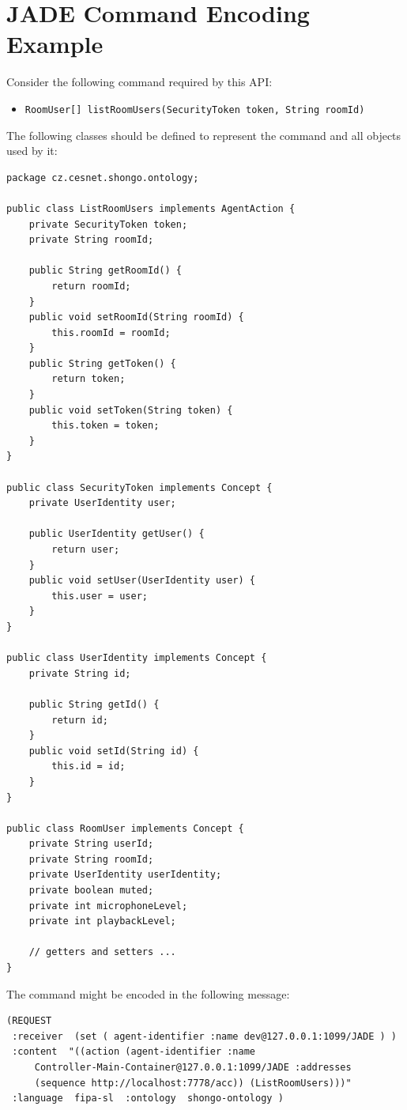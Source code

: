 \documentclass[a4paper]{report}
\newenvironment{Api}{\begin{itemize}}{\end{itemize}}
\newcommand{\ApiCode}[1]{\lstinline[style=styleApi]|#1|}
\newcommand{\ApiItem}[1]{\item #1 %

}
\newcommand{\ApiCmd}[1]{\ApiItem{\ApiCode{#1}}}
\begin{document}
\chapter{JADE Command Encoding Example} \label{appendix:jade-command-encoding}

Consider the following command required by this API:
\begin{Api}
\ApiCmd{RoomUser[] listRoomUsers(SecurityToken token, String roomId)}
\end{Api}

The following classes should be defined to represent the command and all objects used by it:
\begin{verbatim}
package cz.cesnet.shongo.ontology;

public class ListRoomUsers implements AgentAction {
    private SecurityToken token;
    private String roomId;

    public String getRoomId() {
        return roomId;
    }
    public void setRoomId(String roomId) {
        this.roomId = roomId;
    }
    public String getToken() {
        return token;
    }
    public void setToken(String token) {
        this.token = token;
    }
}

public class SecurityToken implements Concept {
    private UserIdentity user;

    public UserIdentity getUser() {
        return user;
    }
    public void setUser(UserIdentity user) {
        this.user = user;
    }
}

public class UserIdentity implements Concept {
    private String id;

    public String getId() {
        return id;
    }
    public void setId(String id) {
        this.id = id;
    }
}

public class RoomUser implements Concept {
    private String userId;
    private String roomId;
    private UserIdentity userIdentity;
    private boolean muted;
    private int microphoneLevel;
    private int playbackLevel;

    // getters and setters ...
}
\end{verbatim}

The command might be encoded in the following message:
\begin{verbatim}
(REQUEST
 :receiver  (set ( agent-identifier :name dev@127.0.0.1:1099/JADE ) )
 :content  "((action (agent-identifier :name
     Controller-Main-Container@127.0.0.1:1099/JADE :addresses
     (sequence http://localhost:7778/acc)) (ListRoomUsers)))"
 :language  fipa-sl  :ontology  shongo-ontology )
\end{verbatim}
\end{document}
